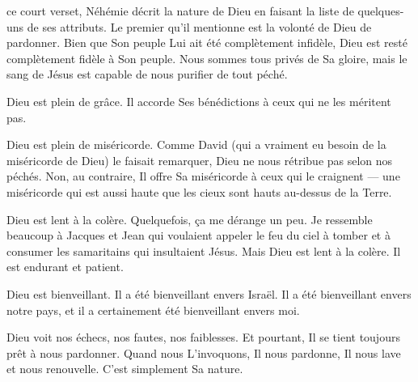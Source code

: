  ce court verset, Néhémie décrit la nature de Dieu
 en faisant la liste de quelques-uns de ses attributs.
 Le premier qu'il mentionne est la volonté de Dieu de pardonner.
 Bien que Son peuple Lui ait été complètement infidèle,
 Dieu est resté complètement fidèle à Son peuple.
 Nous sommes tous privés de Sa gloire,
 mais le sang de Jésus est capable de nous purifier de tout péché.


Dieu est plein de grâce.
 Il accorde Ses bénédictions à ceux qui ne les méritent pas.

Dieu est plein de miséricorde.
 Comme David (qui a vraiment eu besoin de la miséricorde de Dieu)
 le faisait remarquer, Dieu ne nous rétribue pas selon nos péchés.
 Non, au contraire, Il offre Sa miséricorde à ceux qui le craignent ---
 une miséricorde qui est aussi haute que les cieux sont hauts
 au-dessus de la Terre.

Dieu est lent à la colère. Quelquefois, ça me dérange un peu.
 Je ressemble beaucoup à Jacques et Jean qui voulaient appeler
 le feu du ciel à tomber et à consumer les samaritains qui insultaient Jésus.
 Mais Dieu est lent à la colère. Il est endurant et patient.

Dieu est bienveillant. Il a été bienveillant envers Israël.
 Il a été bienveillant envers notre pays,
 et il a certainement été bienveillant envers moi.

Dieu voit nos échecs, nos fautes, nos faiblesses.
 Et pourtant, Il se tient toujours prêt à nous pardonner.
 Quand nous L'invoquons, Il nous pardonne,
 Il nous lave et nous renouvelle. C'est simplement Sa nature.

\dvrule







